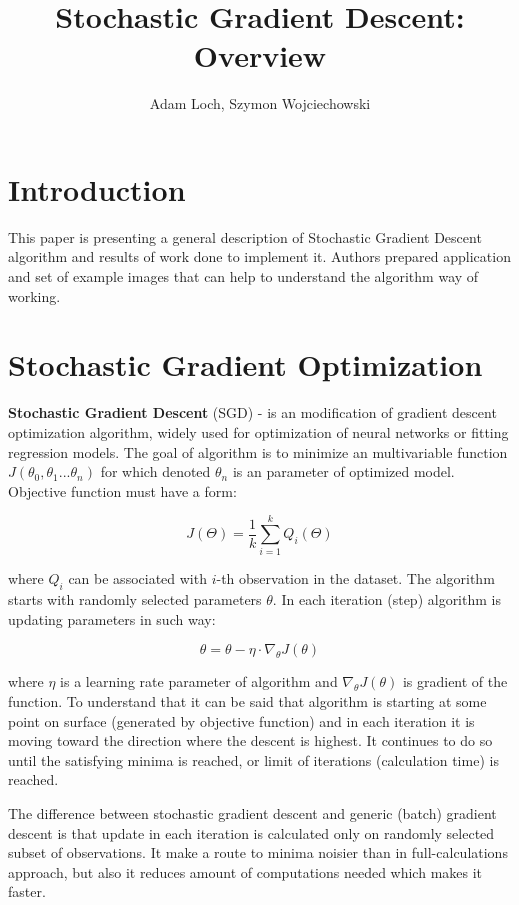 \documentclass[11pt,a4paper]{IEEEtran}
\begin{document}
	\title{Stochastic Gradient Descent: Overview}
	\author{Adam Loch, Szymon Wojciechowski}
	\maketitle

\section{Introduction}
This paper is presenting a general description of Stochastic Gradient Descent algorithm and results of work done to implement it. Authors prepared application and set of example images that can help to understand the algorithm way of working.
\section{Stochastic Gradient Optimization}
\textbf{Stochastic Gradient Descent} (SGD) - is an modification of gradient descent optimization algorithm, widely used for optimization of neural networks \cite{Ruder16} or fitting regression models. The goal of algorithm is to minimize an multivariable function $J(\theta_0, \theta_1 ... \theta_n )$ for which denoted $\theta_n$ is an parameter of optimized model. Objective function must have a form:

$$ J(\Theta) = \frac{1}{k}\sum_{i=1}^{k} Q_i(\Theta) $$

where $Q_i$ can be associated with $i$-th observation in the dataset. The algorithm starts with randomly selected parameters $\theta$. In each iteration (step) algorithm is updating parameters in such way:

$$ \theta = \theta - \eta \cdot \nabla_\theta J( \theta) $$

where $\eta$ is a learning rate parameter of algorithm and $\nabla_\theta J(\theta)$ is gradient of the function. To understand that it can be said that algorithm is starting at some point on surface (generated by objective function) and in each iteration it is moving toward the direction where the descent is highest. It continues to do so until the satisfying minima is reached, or limit of iterations (calculation time) is reached.

The difference between stochastic gradient descent and generic (batch) gradient descent is that update in each iteration is calculated only on randomly selected subset of observations. It make a route to minima noisier than in full-calculations approach, but also it reduces amount of computations needed which makes it faster.
\end{document}
